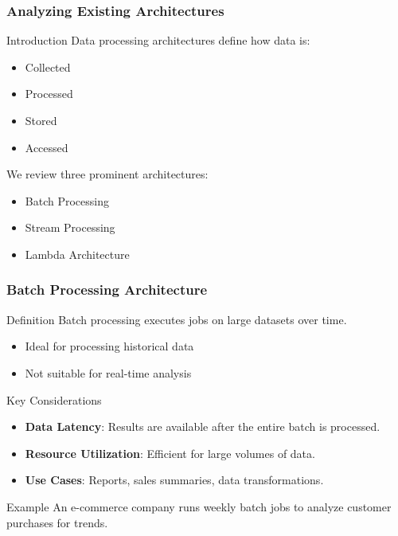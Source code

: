 \documentclass[aspectratio=169]{beamer}
\begin{document}
\begin{frame}[fragile]
    \frametitle{Analyzing Existing Architectures}
    \begin{block}{Introduction}
        Data processing architectures define how data is:
        \begin{itemize}
            \item Collected
            \item Processed
            \item Stored
            \item Accessed
        \end{itemize}
        We review three prominent architectures: 
        \begin{itemize}
            \item Batch Processing
            \item Stream Processing
            \item Lambda Architecture
        \end{itemize}
    \end{block}
\end{frame}

\begin{frame}[fragile]
    \frametitle{Batch Processing Architecture}
    \begin{block}{Definition}
        Batch processing executes jobs on large datasets over time. 
        \begin{itemize}
            \item Ideal for processing historical data
            \item Not suitable for real-time analysis
        \end{itemize}
    \end{block}
    
    \begin{block}{Key Considerations}
        \begin{itemize}
            \item \textbf{Data Latency}: Results are available after the entire batch is processed.
            \item \textbf{Resource Utilization}: Efficient for large volumes of data.
            \item \textbf{Use Cases}: Reports, sales summaries, data transformations.
        \end{itemize}
    \end{block}
    
    \begin{block}{Example}
        An e-commerce company runs weekly batch jobs to analyze customer purchases for trends.
    \end{block}
\end{frame}
\end{document}
